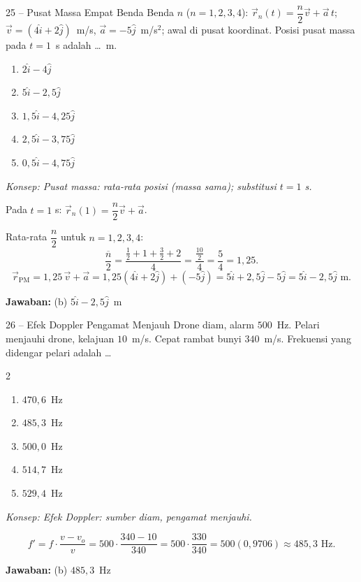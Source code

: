 \documentclass[11pt]{article}
\newcommand{\jawaban}[1]{%
  \noindent\colorbox{gold!30}{\parbox{\dimexpr\linewidth-2\fboxsep\relax}{%
    \textbf{Jawaban:} #1}}\par\smallskip}
\newcommand{\konsep}[1]{\textit{Konsep: #1.}\par\smallskip}
\newenvironment{pil}{%
  \begin{enumerate}[label=(\alph*),leftmargin=*,itemsep=1pt,topsep=3pt]}%
  {\end{enumerate}}
\newenvironment{pilB}{%
  \par\smallskip\begin{multicols}{2}
  \begin{enumerate}[label=(\alph*),leftmargin=*,itemsep=1pt,topsep=3pt]}%
  {\end{enumerate}\end{multicols}}
\begin{document}
\begin{soal}{25 -- Pusat Massa Empat Benda}
Benda $n$ ($n=1,2,3,4$): $\vec{r}_n(t)=\dfrac{n}{2}\vec{v}+\vec{a}\,t$;
$\vec{v}=(4\hat{i}+2\hat{j})$~m/s, $\vec{a}=-5\hat{j}$~m/s$^2$; awal di pusat koordinat.
Posisi pusat massa pada $t=1$~s adalah \ldots~m.
\begin{pil}
  \item $2\hat{i}-4\hat{j}$ \item $5\hat{i}-2{,}5\hat{j}$
  \item $1{,}5\hat{i}-4{,}25\hat{j}$ \item $2{,}5\hat{i}-3{,}75\hat{j}$ \item $0{,}5\hat{i}-4{,}75\hat{j}$
\end{pil}
\end{soal}
\begin{pembox}
\konsep{Pusat massa: rata-rata posisi (massa sama); substitusi $t=1$ s}
Pada $t=1$ s: $\vec{r}_n(1) = \dfrac{n}{2}\vec{v}+\vec{a}$.

Rata-rata $\dfrac{n}{2}$ untuk $n=1,2,3,4$:
\[
\overline{\!\frac{n}{2}\!} = \frac{\tfrac12+1+\tfrac32+2}{4} = \frac{\tfrac{10}{2}}{4} = \frac{5}{4} = 1{,}25.
\]
\[
\vec{r}_{\text{PM}} = 1{,}25\,\vec{v} + \vec{a}
= 1{,}25(4\hat{i}+2\hat{j}) + (-5\hat{j})
= 5\hat{i} + 2{,}5\hat{j} - 5\hat{j}
= 5\hat{i} - 2{,}5\hat{j}\text{ m}.
\]
\jawaban{(b) $5\hat{i}-2{,}5\hat{j}$~m}
\end{pembox}

\begin{soal}{26 -- Efek Doppler Pengamat Menjauh}
Drone diam, alarm $500$~Hz. Pelari menjauhi drone, kelajuan $10$~m/s. Cepat rambat bunyi
$340$~m/s. Frekuensi yang didengar pelari adalah \ldots
\begin{pilB}
  \item $470{,}6$~Hz \item $485{,}3$~Hz \item $500{,}0$~Hz \item $514{,}7$~Hz \item $529{,}4$~Hz
\end{pilB}
\end{soal}
\begin{pembox}
\konsep{Efek Doppler: sumber diam, pengamat menjauhi}
\[
f' = f\cdot\frac{v - v_o}{v}
= 500\cdot\frac{340 - 10}{340}
= 500\cdot\frac{330}{340}
= 500(0{,}9706) \approx 485{,}3\text{ Hz}.
\]
\jawaban{(b) $485{,}3$~Hz}
\end{pembox}
\end{document}
